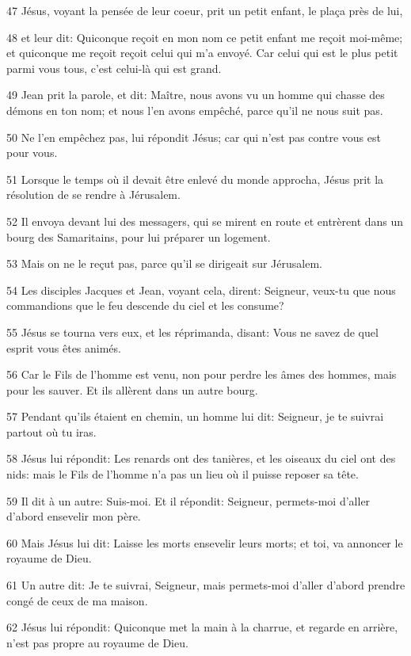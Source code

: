 \par 47 Jésus, voyant la pensée de leur coeur, prit un petit enfant, le plaça près de lui,
\par 48 et leur dit: Quiconque reçoit en mon nom ce petit enfant me reçoit moi-même; et quiconque me reçoit reçoit celui qui m'a envoyé. Car celui qui est le plus petit parmi vous tous, c'est celui-là qui est grand.
\par 49 Jean prit la parole, et dit: Maître, nous avons vu un homme qui chasse des démons en ton nom; et nous l'en avons empêché, parce qu'il ne nous suit pas.
\par 50 Ne l'en empêchez pas, lui répondit Jésus; car qui n'est pas contre vous est pour vous.
\par 51 Lorsque le temps où il devait être enlevé du monde approcha, Jésus prit la résolution de se rendre à Jérusalem.
\par 52 Il envoya devant lui des messagers, qui se mirent en route et entrèrent dans un bourg des Samaritains, pour lui préparer un logement.
\par 53 Mais on ne le reçut pas, parce qu'il se dirigeait sur Jérusalem.
\par 54 Les disciples Jacques et Jean, voyant cela, dirent: Seigneur, veux-tu que nous commandions que le feu descende du ciel et les consume?
\par 55 Jésus se tourna vers eux, et les réprimanda, disant: Vous ne savez de quel esprit vous êtes animés.
\par 56 Car le Fils de l'homme est venu, non pour perdre les âmes des hommes, mais pour les sauver. Et ils allèrent dans un autre bourg.
\par 57 Pendant qu'ils étaient en chemin, un homme lui dit: Seigneur, je te suivrai partout où tu iras.
\par 58 Jésus lui répondit: Les renards ont des tanières, et les oiseaux du ciel ont des nids: mais le Fils de l'homme n'a pas un lieu où il puisse reposer sa tête.
\par 59 Il dit à un autre: Suis-moi. Et il répondit: Seigneur, permets-moi d'aller d'abord ensevelir mon père.
\par 60 Mais Jésus lui dit: Laisse les morts ensevelir leurs morts; et toi, va annoncer le royaume de Dieu.
\par 61 Un autre dit: Je te suivrai, Seigneur, mais permets-moi d'aller d'abord prendre congé de ceux de ma maison.
\par 62 Jésus lui répondit: Quiconque met la main à la charrue, et regarde en arrière, n'est pas propre au royaume de Dieu.


